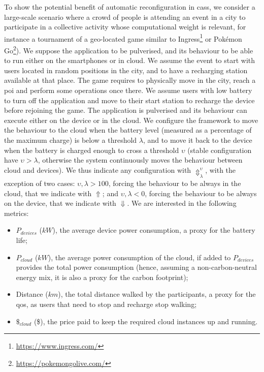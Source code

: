 \documentclass[conference]{IEEEtran}
\begin{document}
To show the potential benefit of automatic reconfiguration in \acp{cas},
we consider a large-scale scenario where a crowd of people is attending an event in a city
to participate in a collective activity whose computational weight is relevant, for instance
a tournament of a geo-located game similar to Ingress\footnote{\url{https://www.ingress.com/}}
or Pokémon Go\footnote{\url{https://pokemongolive.com/}}).
%
We suppose the application to be pulverised,
and its behaviour to be able to run either on the smartphones or in cloud.
%
We assume the event to start with users located in random positions in the city,
and to have a recharging station available at that place.
%
The game requires to physically move in the city,
reach a \ac{poi} and perform some operations once there.
%
We assume users with low battery to turn off the application and move to their start station to recharge the device
before rejoining the game.
%
The application is pulverised and its behaviour can execute either on the device or in the cloud.
%
We configure the framework to move the behaviour to the cloud when the battery level
(measured as a percentage of the maximum charge)
is below a threshold $\lambda$,
and to move it back to the device when the battery is charged enough to cross a threshold $\upsilon$
(stable configuration have $\upsilon{}>\lambda$,
otherwise the system continuously moves the behaviour between cloud and devices).
%
We thus indicate any configuration with $\Updownarrow^{\upsilon}_{\lambda}$,
with the exception of two cases:
$\upsilon, \lambda > 100$, forcing the behaviour to be always in the cloud, that we indicate with $\Uparrow$;
and $\upsilon, \lambda < 0$, forcing the behaviour to be always on the device, that we indicate with $\Downarrow$.
%
We are interested in the following metrics:
%
\begin{itemize}
    \item $P_{devices}$ ($kW$), the average device power consumption, a proxy for the battery life;
    \item $P_{cloud}$ ($kW$), the average power consumption of the cloud, if added to $P_{devices}$
    provides the total power consumption
    (hence, assuming a non-carbon-neutral energy mix, it is also a proxy for the carbon footprint);
    \item Distance ($km$), the total distance walked by the participants, a proxy for the \ac{qos},
    as users that need to stop and recharge stop walking;
    \item $\$_{cloud}$ (\$), the price paid to keep the required cloud instances up and running.
\end{itemize}
\end{document}
